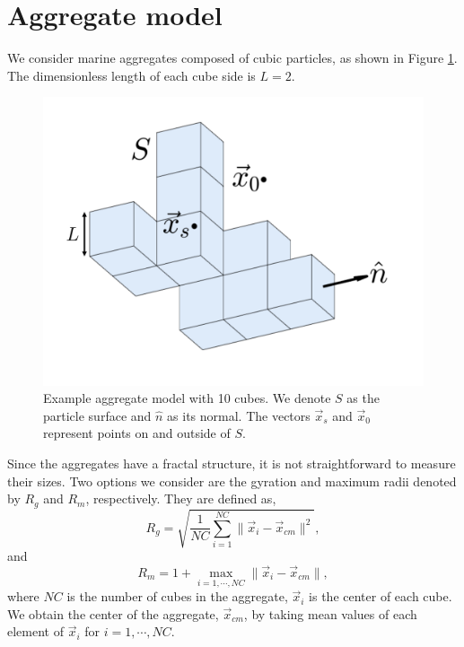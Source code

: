 \section{Aggregate model}
We consider marine aggregates composed of cubic particles, as shown in Figure \ref{fig_cube10}. The dimensionless length of each cube side is $L=2$.
\begin{figure}[ht]
	\begin{center}
		\includegraphics[scale=0.25]{figures/fig_cube10_CC.pdf}
	\end{center}
	\caption{Example aggregate model with 10 cubes. We denote $S$ as the particle surface and $\hat{n}$ as its normal. The vectors $\vec{x}_s$ and $\vec{x}_0$ represent points on and outside of $S$. }
	\label{fig_cube10}
\end{figure}
Since the aggregates have a fractal structure, it is not straightforward to measure their sizes. Two options we consider are the gyration and maximum radii denoted by $R_g$ and $R_m$, respectively. They are defined as,
\begin{equation}
R_g  = \sqrt{\frac{1}{NC} \sum_{i=1}^{NC} \| \vec{x}_i - \vec{x}_{cm} \|^2},
\label{eq_Rg}
\end{equation}
and
\begin{equation}
R_m = 1+ \max_{i = 1, \cdots, NC} \| \vec{x}_i - \vec{x}_{cm} \|,
\label{eq_Rm}
\end{equation}
where $NC$ is the number of cubes in the aggregate, $\vec{x}_i$ is the center of each cube.
We obtain the center of the aggregate, $\vec{x}_{cm}$, by taking mean values of each element of $\vec{x}_i$ for $i = 1, \cdots, NC$.
